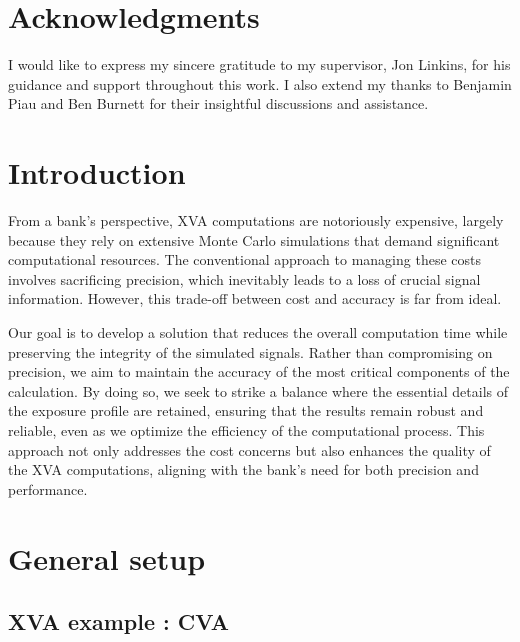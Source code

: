 \documentclass{article}
\begin{document}
\section*{Acknowledgments}
I would like to express my sincere gratitude to my supervisor, Jon Linkins, for his guidance and support throughout this work. I also extend my thanks to Benjamin Piau and Ben Burnett for their insightful discussions and assistance.
\newpage 

\tableofcontents

\newpage

\section{Introduction}

From a bank's perspective, XVA computations are notoriously expensive, largely because they rely on extensive Monte Carlo simulations that demand significant computational resources. The conventional approach to managing these costs involves sacrificing precision, which inevitably leads to a loss of crucial signal information. However, this trade-off between cost and accuracy is far from ideal.

Our goal is to develop a solution that reduces the overall computation time while preserving the integrity of the simulated signals. Rather than compromising on precision, we aim to maintain the accuracy of the most critical components of the calculation. By doing so, we seek to strike a balance where the essential details of the exposure profile are retained, ensuring that the results remain robust and reliable, even as we optimize the efficiency of the computational process. This approach not only addresses the cost concerns but also enhances the quality of the XVA computations, aligning with the bank's need for both precision and performance.

\newpage

\section{General setup}

\subsection{XVA example : CVA}
\end{document}
